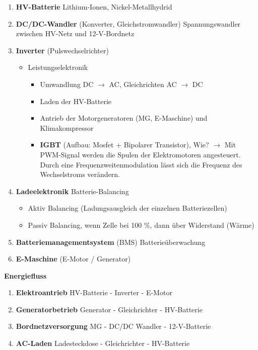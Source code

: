 \begin{enumerate}
\item
  \textbf{HV-Batterie} Lithium-Ionen, Nickel-Metallhydrid
\item
  \textbf{DC/DC-Wandler} (Konverter, Gleichstromwandler)
  Spannungswandler zwischen HV-Netz und 12-V-Bordnetz
\item
  \textbf{Inverter} (Pulswechselrichter)

  \begin{itemize}
  \item
    Leistungselektronik

    \begin{itemize}
    \item
      Umwandlung DC $\to$ AC, Gleichrichten AC $\to$ DC
    \item
      Laden der HV-Batterie
    \item
      Antrieb der Motorgeneratoren (MG, E-Maschine) und Klimakompressor
    \item
      \textbf{IGBT} (Aufbau: Mosfet + Bipolarer Transistor), Wie?
      $\to$ Mit PWM-Signal werden die Spulen der Elektromotoren
      angesteuert. Durch eine Frequenzweitenmodulation lässt sich die
      Frequenz des Wechselstroms verändern.
    \end{itemize}
  \end{itemize}
\item
  \textbf{Ladeelektronik} Batterie-Balancing

  \begin{itemize}
  \item
    Aktiv Balancing (Ladungsausgleich der einzelnen Batteriezellen)
  \item
    Passiv Balancing, wenn Zelle bei 100 \%, dann über Widerstand
    (Wärme)
  \end{itemize}
\item
  \textbf{Batteriemanagementsystem} (BMS) Batterieüberwachung
\item
  \textbf{E-Maschine} (E-Motor / Generator)
\end{enumerate}

\textbf{Energiefluss}

\begin{enumerate}
\item
  \textbf{Elektroantrieb} HV-Batterie - Inverter - E-Motor
\item
  \textbf{Generatorbetrieb} Generator - Gleichrichter - HV-Batterie
\item
  \textbf{Bordnetzversorgung} MG - DC/DC Wandler - 12-V-Batterie
\item
  \textbf{AC-Laden} Ladesteckdose - Gleichrichter - HV-Batterie
\end{enumerate}

